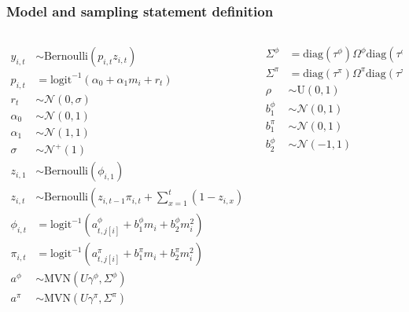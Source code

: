 \documentclass{beamer}
\begin{document}
\begin{frame}
  \frametitle{Model and sampling statement definition}
  \begin{footnotesize}
    \begin{columns}
      \begin{column}{0.5\textwidth}
        \begin{align*}
          y_{i, t} &\sim \text{Bernoulli}(p_{i, t} z_{i, t}) \\
          p_{i, t} &= \text{logit}^{-1}(\alpha_{0} + \alpha_{1} m_{i} + r_{t}) \\ 
          r_{t} &\sim \mathcal{N}(0, \sigma) \\
          \alpha_{0} &\sim \mathcal{N}(0, 1) \\
          \alpha_{1} &\sim \mathcal{N}(1, 1) \\
          \sigma &\sim \mathcal{N}^{+}(1) \\
          z_{i, 1} &\sim \text{Bernoulli}(\phi_{i, 1}) \\
          z_{i, t} &\sim \text{Bernoulli}\left(z_{i, t - 1} \pi_{i,t} + \sum_{x = 1}^{t}(1 - z_{i, x}) \phi_{i,t}\right) \\
          \phi_{i, t} &= \text{logit}^{-1}(a^{\phi}_{t, j[i]} + b^{\phi}_{1} m_{i} + b^{\phi}_{2} m_{i}^{2}) \\
          \pi_{i, t} &= \text{logit}^{-1}(a^{\pi}_{t, j[i]} + b^{\pi}_{1} m_{i} + b^{\pi}_{2} m_{i}^{2}) \\
          a^{\phi} &\sim \text{MVN}(U \gamma^{\phi}, \Sigma^{\phi}) \\
          a^{\pi} &\sim \text{MVN}(U \gamma^{\pi}, \Sigma^{\pi}) \\
        \end{align*}
      \end{column}
      \begin{column}{0.5\textwidth}
        \begin{align*}
          \Sigma^{\phi} &= \text{diag}(\tau^{\phi}) \Omega^{\phi} \text{diag}(\tau^{\phi}) \\
          \Sigma^{\pi} &= \text{diag}(\tau^{\pi}) \Omega^{\pi} \text{diag}(\tau^{\pi}) \\
          \rho &\sim \text{U}(0, 1) \\
          b^{\phi}_{1} &\sim \mathcal{N}(0, 1) \\
          b^{\pi}_{1} &\sim \mathcal{N}(0, 1) \\
          b^{\phi}_{2} &\sim \mathcal{N}(-1, 1) \\

\end{align*}
\end{column}
\end{columns}
\end{footnotesize}
\end{frame}
\end{document}
